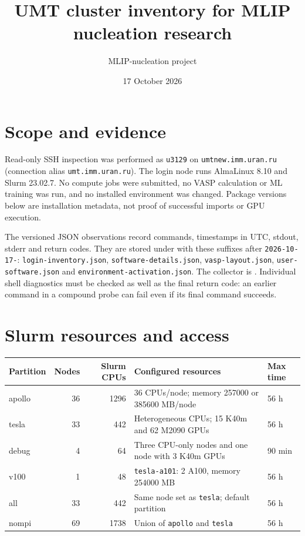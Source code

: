 \documentclass[10pt,a4paper]{article}
\title{UMT cluster inventory for MLIP nucleation research}
\author{MLIP-nucleation project}
\date{17 October 2026}
\begin{document}
\maketitle

\section{Scope and evidence}
Read-only SSH inspection was performed as \texttt{u3129} on
\texttt{umtnew.imm.uran.ru} (connection alias \texttt{umt.imm.uran.ru}).
The login node runs AlmaLinux 8.10 and Slurm 23.02.7.
No compute jobs were submitted, no VASP calculation or ML training was run,
and no installed environment was changed. Package versions below are installation
metadata, not proof of successful imports or GPU execution.

The versioned JSON observations record commands, timestamps in UTC, stdout,
stderr and return codes. They are stored under
 with these suffixes after \texttt{2026-10-17-}:
\texttt{login-inventory.json}, \texttt{software-details.json},
\texttt{vasp-layout.json}, \texttt{user-software.json} and
\texttt{environment-activation.json}.
The collector is .
Individual shell diagnostics must be checked as well as the final return code:
an earlier command in a compound probe can fail even if its final command succeeds.

\section{Slurm resources and access}
\begin{tabularx}{\linewidth}{@{}lrrXl@{}}
\toprule
Partition & Nodes & Slurm CPUs & Configured resources & Max time \\
\midrule
apollo & 36 & 1296 & 36 CPUs/node; memory 257000 or 385600 MB/node & 56 h \\
tesla & 33 & 442 & Heterogeneous CPUs; 15 K40m and 62 M2090 GPUs & 56 h \\
debug & 4 & 64 & Three CPU-only nodes and one node with 3 K40m GPUs & 90 min \\
v100 & 1 & 48 & \texttt{tesla-a101}: 2 A100, memory 254000 MB & 56 h \\
all & 33 & 442 & Same node set as \texttt{tesla}; default partition & 56 h \\
nompi & 69 & 1738 & Union of \texttt{apollo} and \texttt{tesla} & 56 h \\
\bottomrule
\end{tabularx}
\end{document}
